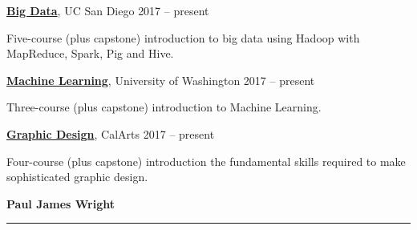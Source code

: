 \documentclass[10pt]{article}
\newcommand{\makeheading}[2][]%
        {\hspace*{-\marginparsep minus \marginparwidth}%
         \begin{minipage}[t]{\textwidth+\marginparwidth+\marginparsep}%
             {\large \bfseries #2 \hfill #1}\\[-0.15\baselineskip]%
                 \rule{\columnwidth}{1pt}%
         \end{minipage}}
\renewcommand{\section}[1]{\pagebreak[3]%
    \vspace{1.3\baselineskip}%
    \phantomsection\addcontentsline{toc}{section}{#1}%
    \noindent\llap{\scshape\smash{\parbox[t]{\marginparwidth}{\hyphenpenalty=10000\raggedright #1}}}%
    \vspace{-\baselineskip}\par}
\begin{document}
\begin{innerlist}
    \item[] {\bf{\href{https://www.coursera.org/specializations/big-data}{Big Data}}}, UC San Diego \hfill{2017 -- present}
    \begin{innerlist}
    	\item[]  Five-course (plus capstone) introduction to big data using Hadoop with MapReduce, Spark, Pig and Hive.
    \end{innerlist}        
    \item[] {\bf{\href{https://www.coursera.org/specializations/machine-learning}{Machine Learning}}}, University of Washington \hfill{2017 -- present}
    \begin{innerlist}
    	\item[] Three-course (plus capstone) introduction to Machine Learning.
    \end{innerlist}       
    \item[] {\bf{\href{https://www.coursera.org/specializations/graphic-design}{Graphic Design}}}, CalArts \hfill{2017 -- present}
    \begin{innerlist}
    	\item[] Four-course (plus capstone) introduction the fundamental skills required to make sophisticated graphic design. \\
    \end{innerlist}
 \end{innerlist}

\newpage
\makeheading{Paul James Wright} 
%
               
\end{document}
